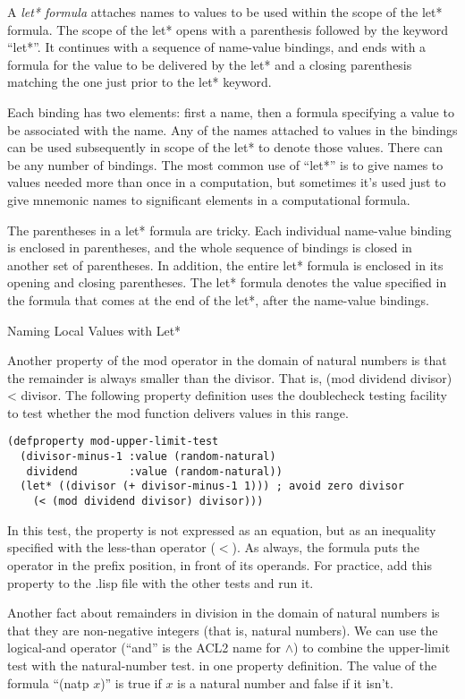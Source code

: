 \begin{aside}
A \emph{let* formula} attaches names to values
to be used within the scope of the let* formula.
The scope of the let* opens with a parenthesis followed
by the keyword ``let*''. It continues with
a sequence of name-value bindings, and ends with
a formula for the value to be delivered by the let*
and a closing parenthesis matching the one just prior
to the let* keyword.

Each binding has two elements: first a name,
then a formula specifying a value to be associated with the name.
Any of the names attached to values in the bindings
can be used subsequently in scope of the let* to denote those values.
There can be any number of bindings.
The most common use of ``let*'' is to give names
to values needed more than once in a computation,
but sometimes it's used just to give mnemonic names
to significant elements in a computational formula.

The parentheses in a let* formula are tricky.
Each individual name-value binding is enclosed in parentheses,
and the whole sequence of bindings is closed in another set
of parentheses. In addition, the entire let* formula
is enclosed in its opening and closing parentheses.
The let* formula denotes the value specified
in the formula that comes at the end of the let*, after the 
name-value bindings.
\caption{Naming Local Values with Let*}
\label{let*-def}
\end{aside}

Another property of the mod operator
in the domain of natural numbers
is that the remainder
is always smaller than the divisor.
That is, (mod dividend divisor) < divisor.
The following property definition uses
the doublecheck testing facility
to test whether the mod function delivers values in this range.

\begin{Verbatim}
(defproperty mod-upper-limit-test
  (divisor-minus-1 :value (random-natural)
   dividend        :value (random-natural))
  (let* ((divisor (+ divisor-minus-1 1))) ; avoid zero divisor
    (< (mod dividend divisor) divisor)))
\end{Verbatim}

In this test, the property is not expressed as an equation,
but as an inequality
specified with the less-than operator ($<$).
As always, the formula puts the operator in the prefix position,
in front of its operands.
For practice, add this property to the .lisp file with the other tests and run it.

Another fact about remainders in division in the domain of natural numbers is that
they are non-negative integers (that is, natural numbers).
We can use the logical-and operator (``and'' is the ACL2 name for $\wedge$)
to combine the upper-limit test with the natural-number test.
in one property definition.
\label{natp-op}
The value of the formula ``(natp $x$)'' is true
if $x$ is a natural number and false if it isn't.

